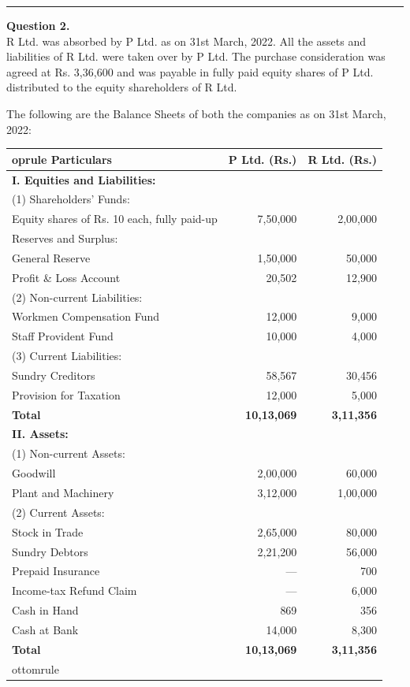 \documentclass[11pt,a4paper]{article}
\begin{document}
\medskip\rule{\linewidth}{0.2pt}




\noindent   \textbf{Question 2.} \\
R Ltd. was absorbed by P Ltd. as on 31st March, 2022. All the assets and liabilities of R Ltd. were taken over by P Ltd. The purchase consideration was agreed at Rs. 3,36,600 and was payable in fully paid equity shares of P Ltd. distributed to the equity shareholders of R Ltd. 

The following are the Balance Sheets of both the companies as on 31st March, 2022:


\begin{table}[h!]
  \centering
  \small
  
\begin{tabular}{lrr}
     oprule
   \textbf{Particulars} &   \textbf{P Ltd. (Rs.)} &   \textbf{R Ltd. (Rs.)} \\
    \midrule
   \textbf{I. Equities and Liabilities:} & & \\
    (1) Shareholders' Funds: & & \\
    \quad Equity shares of Rs. 10 each, fully paid-up & 7,50,000 & 2,00,000 \\
    \quad Reserves and Surplus: & & \\
    \quad\quad General Reserve & 1,50,000 & 50,000 \\
    \quad\quad Profit \& Loss Account & 20,502 & 12,900 \\
    (2) Non-current Liabilities: & & \\
    \quad Workmen Compensation Fund & 12,000 & 9,000 \\
    \quad Staff Provident Fund & 10,000 & 4,000 \\
    (3) Current Liabilities: & & \\
    \quad Sundry Creditors & 58,567 & 30,456 \\
    \quad Provision for Taxation & 12,000 & 5,000 \\
    \midrule
   \textbf{Total} &   \textbf{10,13,069} &   \textbf{3,11,356} \\
    \midrule
   \textbf{II. Assets:} & & \\
    (1) Non-current Assets: & & \\
    \quad Goodwill & 2,00,000 & 60,000 \\
    \quad Plant and Machinery & 3,12,000 & 1,00,000 \\
    (2) Current Assets: & & \\
    \quad Stock in Trade & 2,65,000 & 80,000 \\
    \quad Sundry Debtors & 2,21,200 & 56,000 \\
    \quad Prepaid Insurance & --- & 700 \\
    \quad Income-tax Refund Claim & --- & 6,000 \\
    \quad Cash in Hand & 869 & 356 \\
    \quad Cash at Bank & 14,000 & 8,300 \\
    \midrule
   \textbf{Total} &   \textbf{10,13,069} &   \textbf{3,11,356} \\
    ottomrule
  \end{tabular}
\end{table}
\end{document}
